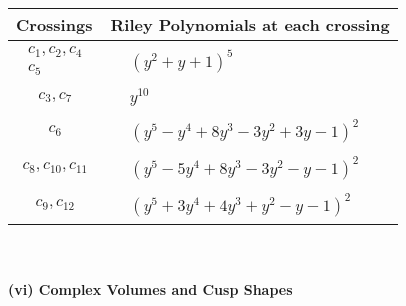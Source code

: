 \documentclass[1p]{elsarticle_modified}
\theoremstyle{definition}
\begin{document}
\begin{tabular}{m{50pt}|m{274pt}}
Crossings & \hspace{64pt}Riley Polynomials at each crossing \\
\hline $$\begin{aligned}c_{1},c_{2},c_{4}\\c_{5}\end{aligned}$$&$\begin{aligned}
&(y^2+y+1)^5
\end{aligned}$\\
\hline $$\begin{aligned}c_{3},c_{7}\end{aligned}$$&$\begin{aligned}
&y^{10}
\end{aligned}$\\
\hline $$\begin{aligned}c_{6}\end{aligned}$$&$\begin{aligned}
&(y^5- y^4+8 y^3-3 y^2+3 y-1)^2
\end{aligned}$\\
\hline $$\begin{aligned}c_{8},c_{10},c_{11}\end{aligned}$$&$\begin{aligned}
&(y^5-5 y^4+8 y^3-3 y^2- y-1)^2
\end{aligned}$\\
\hline $$\begin{aligned}c_{9},c_{12}\end{aligned}$$&$\begin{aligned}
&(y^5+3 y^4+4 y^3+y^2- y-1)^2
\end{aligned}$\\
\hline
\end{tabular}\\~\\
\newpage\flushleft \textbf{(vi) Complex Volumes and Cusp Shapes}
\end{document}
